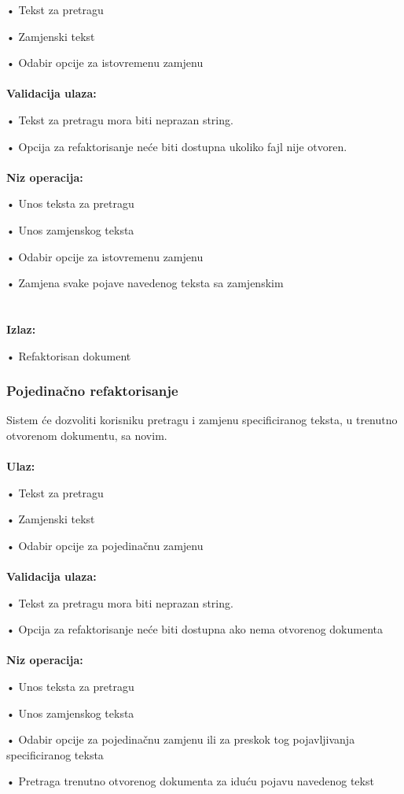 \documentclass[12pt]{article}
\begin{document}
•	Tekst za pretragu 

•	Zamjenski tekst

•	Odabir opcije za istovremenu zamjenu\\ \\
\textbf{Validacija ulaza:}

•	Tekst za pretragu mora biti neprazan string. 

•	Opcija za refaktorisanje neće biti dostupna ukoliko fajl nije otvoren. \\ \\
\textbf{Niz operacija:}

•	Unos teksta za pretragu 

•	Unos zamjenskog teksta 

•	Odabir opcije za istovremenu zamjenu 

•	Zamjena svake pojave navedenog teksta sa zamjenskim\\ \\ \\
\textbf{Izlaz:}

 •	Refaktorisan dokument
 
\subsubsection{Pojedinačno refaktorisanje}
Sistem će dozvoliti korisniku pretragu i zamjenu specificiranog teksta, u trenutno otvorenom dokumentu, sa novim. \\ \\
\textbf{Ulaz:}

•	Tekst za pretragu 

•	Zamjenski tekst

•	Odabir opcije za pojedinačnu zamjenu\\ \\
\textbf{Validacija ulaza:}

•	Tekst za pretragu mora biti neprazan string. 

•	Opcija za refaktorisanje neće biti dostupna ako nema otvorenog dokumenta\\ \\
\textbf{Niz operacija:}

•	Unos teksta za pretragu 

•	Unos zamjenskog teksta 

•	Odabir opcije za pojedinačnu zamjenu ili za preskok tog pojavljivanja specificiranog teksta

•	Pretraga trenutno otvorenog dokumenta za iduću pojavu navedenog tekst 
\end{document}
